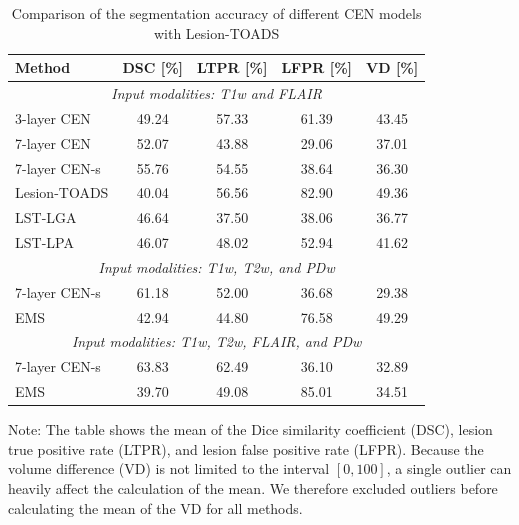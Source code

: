\begin{table}
\begin{center}
\caption{Comparison of the segmentation accuracy of different CEN models with
Lesion-TOADS}
\label{tab:results1}
\begin{tabular}{@{}lcccc@{}}
\toprule
Method & DSC [\%] & LTPR [\%] & LFPR [\%] & VD [\%] \\
\midrule
\multicolumn{5}{c}{\textit{Input modalities: T1w and FLAIR}} \\
\midrule
3-layer CEN \cite{brosch2015} & 49.24 & 57.33 & 61.39 & 43.45 \\
7-layer CEN & 52.07 & 43.88 & 29.06 & 37.01 \\ 
7-layer CEN-s & 55.76 & 54.55 & 38.64 & 36.30 \\[0.2em]
Lesion-TOADS \cite{shiee2010topology} & 40.04 & 56.56 & 82.90 & 49.36 \\ 
LST-LGA \cite{schmidt2012automated} & 46.64 & 37.50 & 38.06 & 36.77 \\
LST-LPA \cite{schmidt2012automated} & 46.07 & 48.02 & 52.94 & 41.62 \\
\midrule
\multicolumn{5}{c}{\textit{Input modalities: T1w, T2w, and PDw}} \\
\midrule
7-layer CEN-s & 61.18 & 52.00 & 36.68 & 29.38 \\
EMS \cite{vanleemput2001} & 42.94 & 44.80 & 76.58 & 49.29 \\
\midrule
\multicolumn{5}{c}{\textit{Input modalities: T1w, T2w, FLAIR, and PDw}} \\
\midrule
7-layer CEN-s & 63.83 & 62.49 & 36.10 & 32.89 \\
EMS \cite{vanleemput2001} & 39.70 & 49.08 & 85.01 & 34.51 \\
\bottomrule
\end{tabular}
\end{center}
Note: The table shows the mean of the Dice similarity coefficient (DSC), lesion
true positive rate (LTPR), and lesion false positive rate (LFPR). Because
the volume difference (VD) is not limited to the interval $[0, 100]$, a
single outlier can heavily affect the calculation of the mean. We therefore
excluded outliers before calculating the mean of the VD for all methods.
\end{table}

